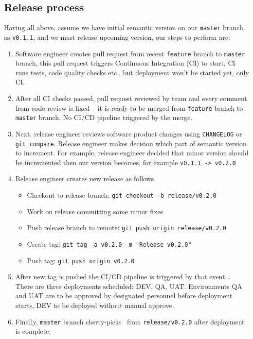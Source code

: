 \subsection{Release process}\label{subsec:release-process}
Having all above, assume we have initial semantic version on our \texttt{master} branch as \texttt{v0.1.1},
and we must release upcoming version, our steps to perform are:
\begin{enumerate}
    \item Software engineer creates pull request from recent \texttt{feature} branch to \texttt{master} branch,
    this pull request triggers Continuous Integration (CI) to start, CI runs tests, code quality checks etc.,
    but deployment won't be started yet, only CI\@.
    \item After all CI checks passed, pull request reviewed by team and every comment from code review is fixed --
    it is ready to be merged from \texttt{feature} branch to \texttt{master} branch.
    No CI/CD pipeline triggered by the merge.
    \item Next, release engineer reviews software product changes using \texttt{CHANGELOG} or \texttt{git compare}.
    Release engineer makes decision which part of semantic version to increment.
    For example, release engineer decided that minor version should be incremented then our version becomes,
    for example \texttt{v0.1.1 -> v0.2.0}
    \item Release engineer creates new release as follows
    \begin{itemize}
        \item Checkout to release branch: \texttt{git checkout -b release/v0.2.0}
        \item Work on release committing some minor fixes
        \item Push release branch to remote: \texttt{git push origin release/v0.2.0}
        \item Create tag: \texttt{git tag -a v0.2.0 -m "Release v0.2.0"}
        \item Push tag: \texttt{git push origin v0.2.0}
    \end{itemize}
    \item After new tag is pushed the CI/CD pipeline is triggered by that event~\cite{AzurePipelinesTriggers}.
    There are three deployments scheduled: DEV, QA, UAT\@.
    Environments QA and UAT are to be approved by designated personnel before deployment starts,
    DEV to be deployed without manual approve.
    \item Finally, \texttt{master} branch cherry-picks~\cite{CherryPick} from \texttt{release/v0.2.0} after deployment is complete.
\end{enumerate}
